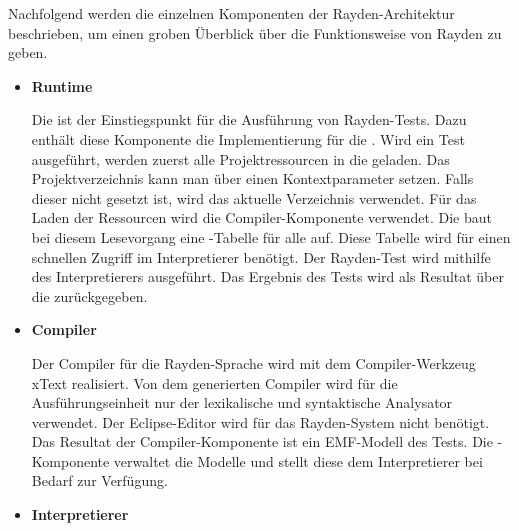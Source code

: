 \SuperPar
Nachfolgend werden die einzelnen Komponenten der Rayden-Architektur beschrieben, um einen groben Überblick über die Funktionsweise von Rayden zu geben.\\

\begin{itemize}

\item \textbf{Runtime}

Die  ist der Einstiegspunkt für die Ausführung von Rayden-Tests. Dazu enthält diese Komponente die Implementierung für die . Wird ein Test ausgeführt, werden zuerst alle Projektressourcen in die  geladen. Das Projektverzeichnis kann man über einen Kontextparameter setzen. Falls dieser nicht gesetzt ist, wird das aktuelle Verzeichnis verwendet. Für das Laden der Ressourcen wird die Compiler-Komponente verwendet. Die  baut bei diesem Lesevorgang eine -Tabelle für alle  auf. Diese Tabelle wird für einen schnellen Zugriff im Interpretierer benötigt. Der Rayden-Test wird mithilfe des Interpretierers ausgeführt. Das Ergebnis des Tests wird als Resultat über die  zurückgegeben.\\

\item \textbf{Compiler}

Der Compiler für die Rayden-Sprache wird mit dem Compiler-Werkzeug xText \cite{xtext} realisiert. Von dem generierten Compiler wird für die Ausführungseinheit nur der lexikalische und syntaktische Analysator verwendet. Der Eclipse-Editor wird für das Rayden-System nicht benötigt. Das Resultat der Compiler-Komponente ist ein EMF-Modell des Tests. Die -Komponente verwaltet die Modelle und stellt diese dem Interpretierer bei Bedarf zur Verfügung.\\

\item \textbf{Interpretierer}


\end{itemize}
